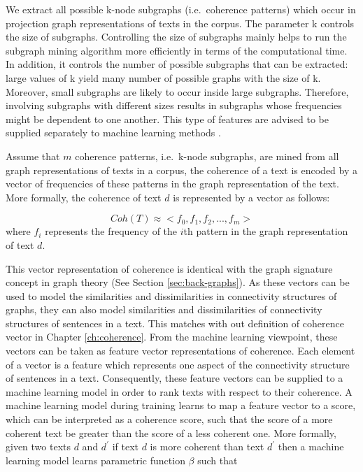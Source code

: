 We extract all possible k-node subgraphs (i.e.\ coherence patterns) which occur in projection graph representations of texts in the corpus. 
The parameter k controls the size of subgraphs.  
Controlling the size of subgraphs mainly helps to run the subgraph mining algorithm more efficiently in terms of the computational time.
In addition, it controls the number of possible subgraphs that can be extracted: large values of k yield many number of possible graphs with the size of k. 
Moreover, small subgraphs are likely to occur inside large subgraphs. 
Therefore, involving subgraphs with different sizes results in subgraphs whose frequencies might be dependent to one another. 
This type of features are advised to be supplied separately to machine learning methods \cite{aggarwalcharu18}. 

Assume that $m$ coherence patterns, i.e.\ k-node subgraphs, are mined from all graph representations of texts in a corpus, the coherence of a text is encoded by a vector of frequencies of these patterns in the graph representation of the text. 
More formally, the coherence of  text $d$ is represented by a vector as follows:

\begin{equation}
Coh(T) \approx <f_0,f_1,f_2,...,f_m>
\end{equation}
where $f_i$ represents the frequency of the $i${th} pattern in the graph representation of text $d$. 

This vector representation of coherence is identical with the graph signature concept in graph theory (See Section \ref{sec:back-graphs}). 
As these vectors can be used to model the similarities and dissimilarities in connectivity structures of graphs, they can also model similarities and dissimilarities of connectivity structures of sentences in a text. 
This matches with out definition of coherence vector in Chapter \ref{ch:coherence}.   
From the machine learning viewpoint, these vectors can be taken as feature vector representations of coherence. 
Each element of a vector is a feature which represents one aspect of the connectivity structure of sentences in a text. 
Consequently, these feature vectors can be supplied to a machine learning model in order to rank texts with respect to their coherence. 
A machine learning model during training learns to map a feature vector to a score, which can be interpreted as a coherence score, such that the score of a more coherent text be greater than the score of a less coherent one. 
More formally, given two texts $d$ and $d^\prime$ if text $d$ is more coherent than text $d^\prime$ then a machine learning model learns parametric function $\beta$ such that 

